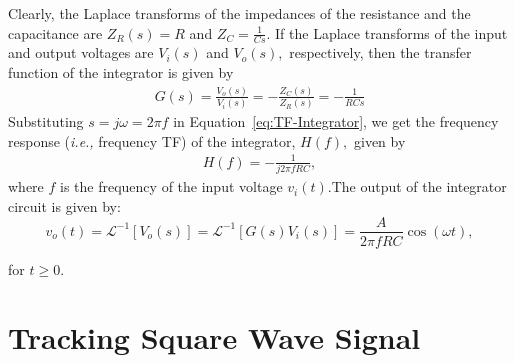 %
Clearly, the Laplace transforms of the impedances of the resistance and the capacitance are $Z_R(s) = R$ and $Z_C=\frac{1}{Cs}.$ If the Laplace transforms of the input and output voltages are $V_i(s)$ and $V_o(s),$ respectively, then  the transfer function of the integrator is given by %
%
\begin{align}
  G(s) = \frac{V_o(s)}{V_i(s)} = -\frac{Z_C(s)}{Z_R(s)} = -\frac{1}{RCs}
  \label{eq:TF-Integrator}
\end{align}
%
Substituting $s=j\omega=2\pi f$ in Equation~\eqref{eq:TF-Integrator}, we get the frequency response (\textit{i.e.,} frequency TF) of the integrator, $H(f),$ given by %
%
\begin{align}
  H(f) = -\frac{1}{j2\pi fRC},
  \label{eq:frequencyTF-Integrator}
\end{align}
%
where $f$ is the frequency of the input voltage $v_i(t).$The output of the integrator circuit is given by: %
%
    \begin{equation}
      v_o(t)= \mathscr{L}^{-1}\left[V_o(s)\right]  = \mathscr{L}^{-1}\left[G(s)V_i(s)\right]  = \frac{A}{2\pi fRC}\cos(\omega t),
      \label{eq:integratorOutput}
    \end{equation}
%

    for $t\ge 0.$

\section{Tracking Square Wave Signal }
\label{sec:followingSquareWave}

